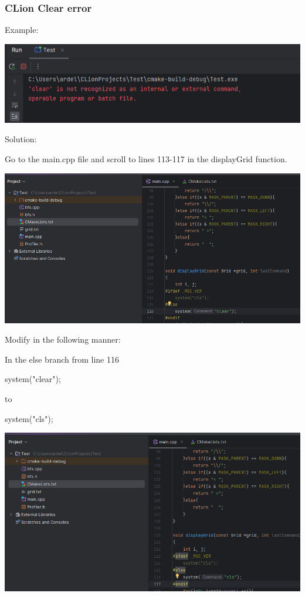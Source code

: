 \documentclass[../en-fa-lab.tex]{subfiles}
\begin{document}
\subsubsection{\texorpdfstring{CLion Clear error
}{CLion Clear error }}\label{clion-clear-error}

Example:

\includegraphics[width=\textwidth,alt={A screenshot of a computer program Description automatically generated}]{./Resources/tutorial_lab9/image22.png}

Solution:

Go to the main.cpp file and scroll to lines 113-117 in the displayGrid
function.

\includegraphics[width=\textwidth,alt={A screen shot of a computer Description automatically generated}]{./Resources/tutorial_lab9/image23.png}

Modify in the following manner:

In the else branch from line 116

system("clear");

to

system("cls");

\includegraphics[width=\textwidth,alt={A screenshot of a computer program Description automatically generated}]{./Resources/tutorial_lab9/image24.png}
\end{document}
